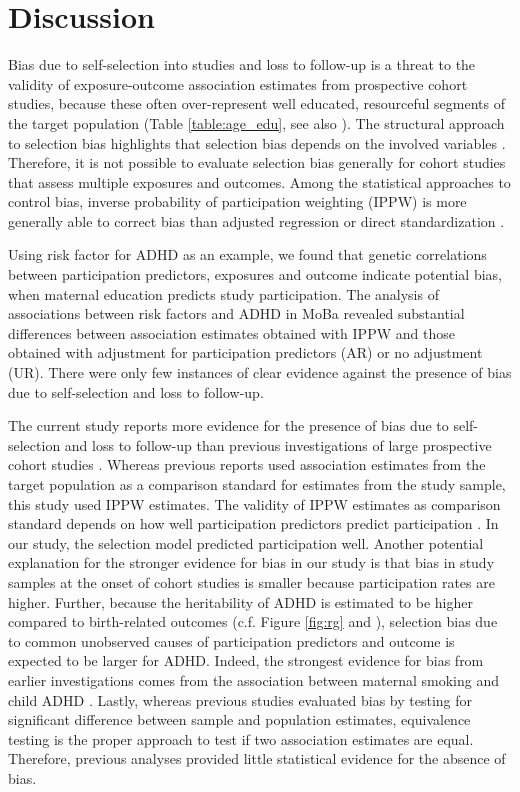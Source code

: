 \documentclass[12pt]{article}
\begin{document}
\section{Discussion}
Bias due to self-selection into studies and loss to follow-up is a threat to the validity of exposure-outcome association estimates from prospective cohort studies, because these often over-represent well educated, resourceful segments of the target population (Table \ref{table:age_edu}, see also \cite{Vinther-Larsen2010-hq, Galea2007-hv, Howe2013-vv}). The structural approach to selection bias highlights that selection bias depends on the involved variables \cite{Hernan2004-oz}. Therefore, it is not possible to evaluate selection bias generally for cohort studies that assess multiple exposures and outcomes. Among the statistical approaches to control bias, inverse probability of participation weighting (IPPW) is more generally able to correct bias than adjusted regression or direct standardization \cite{Hernan2004-oz}.

Using risk factor for ADHD as an example, we found that genetic correlations between participation predictors, exposures and outcome indicate potential bias, when maternal education predicts study participation. The analysis of associations between risk factors and ADHD in MoBa revealed substantial differences between association estimates obtained with IPPW and those obtained with adjustment for participation predictors (AR) or no adjustment (UR). There were only few instances of clear evidence against the presence of bias due to self-selection and loss to follow-up.

The current study reports more evidence for the presence of bias due to self-selection and loss to follow-up than previous investigations of large prospective cohort studies \cite{Nilsen2009-ci, Nohr2006-uf,Greene2011-am, Wolke2009-lu}. Whereas previous reports used association estimates from the target population as a comparison standard for estimates from the study sample, this study used IPPW estimates. The validity of IPPW estimates as comparison standard depends on how well participation predictors predict participation \cite{Seaman2013-rj}. In our study, the selection model predicted participation well. Another potential explanation for the stronger evidence for bias in our study is that bias in study samples at the onset of cohort studies is smaller because participation rates are higher. Further, because the heritability of ADHD is estimated to be higher compared to birth-related outcomes (c.f. Figure \ref{fig:rg} and \cite{Wu2015-bg}), selection bias due to common unobserved causes of participation predictors and outcome is expected to be larger for ADHD. Indeed, the strongest evidence for bias from earlier investigations comes from the association between maternal smoking and child ADHD \cite{Greene2011-am}. Lastly, whereas previous studies evaluated bias by testing for significant difference between sample and population estimates, equivalence testing \cite{Schuirmann1987-ip, Mascha2011-um} is the proper approach to test if two association estimates are equal. Therefore, previous analyses provided little statistical evidence for the absence of bias. 
\end{document}
